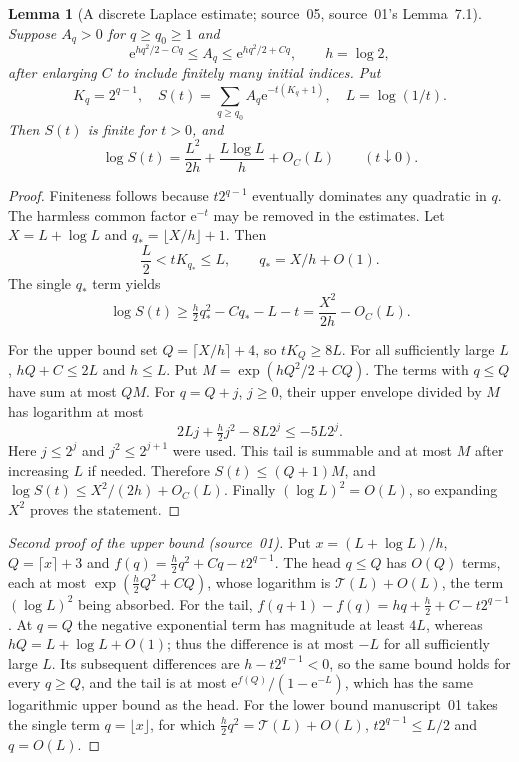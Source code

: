 \documentclass[11pt,a4paper]{article}
\newtheorem{lemma}[theorem]{Lemma}
\theoremstyle{definition}
\newcommand{\e}{\mathrm e}
\begin{document}
\begin{lemma}[A discrete Laplace estimate; source~05, source~01's Lemma~7.1]\label{sbd:xtm:lem:laplace}
Suppose $A_q>0$ for $q\ge q_0\ge1$ and
\begin{equation}\label{sbd:xtm:eq:generic-envelope}
 \e^{hq^2/2-Cq}\le A_q\le\e^{hq^2/2+Cq},\qquad h=\log2,
\end{equation}
after enlarging $C$ to include finitely many initial indices. Put
\[
 K_q=2^{q-1},\quad
 S(t)=\sum_{q\ge q_0}A_q\e^{-t(K_q+1)},\quad
 L=\log(1/t).
\]
Then $S(t)$ is finite for $t>0$, and
\begin{equation}\label{sbd:xtm:eq:laplace-law}
 \log S(t)=\frac{L^2}{2h}+\frac{L\log L}{h}+O_C(L)
 \qquad(t\downarrow0).
\end{equation}
\end{lemma}
\begin{proof}
Finiteness follows because $t2^{q-1}$ eventually dominates any
quadratic in $q$. The harmless common factor $\e^{-t}$ may be
removed in the estimates. Let $X=L+\log L$ and
$q_* =\lfloor X/h\rfloor+1$. Then
\begin{equation}\label{sbd:xtm:eq:qstar}
 \frac L2<tK_{q_*}\le L,\qquad q_* =X/h+O(1).
\end{equation}
The single $q_*$ term yields
\[
 \log S(t)\ge\tfrac h2q_*^2-Cq_*-L-t
             =\frac{X^2}{2h}-O_C(L).
\]

For the upper bound set $Q=\lceil X/h\rceil+4$, so
$tK_Q\ge8L$. For all sufficiently large $L$, $hQ+C\le2L$ and
$h\le L$. Put $M=\exp(hQ^2/2+CQ)$. The terms with $q\le Q$
have sum at most $QM$. For $q=Q+j$, $j\ge0$, their upper envelope
divided by $M$ has logarithm at most
\[
 2Lj+\tfrac h2j^2-8L2^j\le-5L2^j.
\]
Here $j\le2^j$ and $j^2\le2^{j+1}$ were used. This tail is
summable and at most $M$ after increasing $L$ if needed. Therefore
$S(t)\le(Q+1)M$, and
$\log S(t)\le X^2/(2h)+O_C(L)$. Finally
$(\log L)^2=O(L)$, so expanding $X^2$ proves the statement.
\end{proof}

\begin{proof}[Second proof of the upper bound (source~01)]
Put $x=(L+\log L)/h$, $Q=\lceil x\rceil+3$ and
$f(q)=\tfrac h2q^2+Cq-t2^{q-1}$. The head $q\le Q$ has $O(Q)$ terms, each
at most $\exp(\tfrac h2Q^2+CQ)$, whose logarithm is
$\mathcal T(L)+O(L)$, the term $(\log L)^2$ being absorbed. For the tail,
$f(q+1)-f(q)=hq+\tfrac h2+C-t2^{q-1}$. At $q=Q$ the negative exponential
term has magnitude at least $4L$, whereas $hQ=L+\log L+O(1)$; thus the
difference is at most $-L$ for all sufficiently large $L$. Its subsequent
differences are $h-t2^{q-1}<0$, so the same bound holds for every $q\ge Q$,
and the tail is at most $\e^{f(Q)}/(1-\e^{-L})$, which has the same
logarithmic upper bound as the head. For the lower bound manuscript~01 takes
the single term $q=\lfloor x\rfloor$, for which $\tfrac h2q^2=\mathcal
T(L)+O(L)$, $t2^{q-1}\le L/2$ and $q=O(L)$.
\end{proof}
\end{document}
